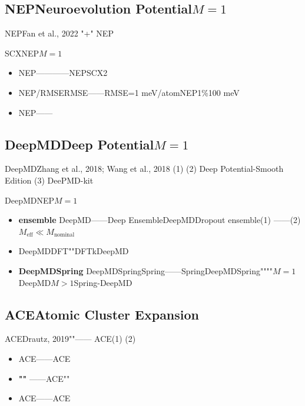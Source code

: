 \documentclass[12pt,a4paper]{article}
\theoremstyle{remark}
\begin{document}
\subsection{NEPNeuroevolution Potential$M=1$}

NEPFan et al., 2022
"+"
NEP


SCXNEP\textbf{$M=1$}

\begin{itemize}[itemsep=3pt]
    \item \textbf{} NEP————NEPSCX2
    \item \textbf{} NEP/RMSERMSE——RMSE=1 meV/atomNEP1\%100 meV
    \item \textbf{} NEP——
\end{itemize}

\subsection{DeepMDDeep Potential$M=1$}

DeepMDZhang et al., 2018; Wang et al., 2018
(1) 
(2) Deep Potential-Smooth Edition
(3) DeePMD-kit

DeepMDNEP$M=1$

\begin{itemize}[itemsep=3pt]
    \item \textbf{ensemble} DeepMD——Deep EnsembleDeepMDDropout ensemble(1) \textit{}——(2) $M_{\text{eff}} \ll M_{\text{nominal}}$
    \item \textbf{} DeepMDDFT""DFTkDeepMD
    \item \textbf{DeepMDSpring} DeepMD\textit{}SpringSpring\textbf{}——SpringDeepMDSpring""""$M=1$DeepMD$M>1$Spring-DeepMD
\end{itemize}

\subsection{ACEAtomic Cluster Expansion}

ACEDrautz, 2019""——
ACE(1) (2) 

\textit{}

\begin{itemize}[itemsep=3pt]
    \item \textbf{} ACE——ACE
    \item \textbf{""} \textit{}——ACE""
    \item \textbf{} ACE——ACE
\end{itemize}

\subsection{}
\end{document}
